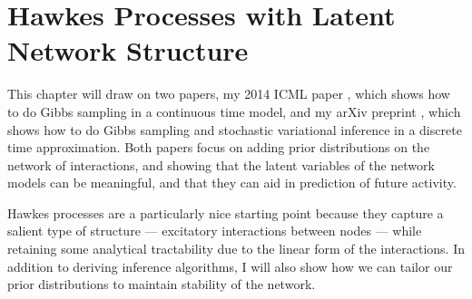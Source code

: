 
\chapter{Hawkes Processes with Latent Network Structure}

This chapter will draw on two papers, my 2014 ICML paper \cite{linderman2014discovering}, 
which shows how to do Gibbs sampling in a continuous time model,
and my arXiv preprint \cite{linderman2015scalable}, which shows 
how to do Gibbs sampling and stochastic variational inference in 
a discrete time approximation.  Both papers focus on
adding prior distributions on the network of interactions, and 
showing that the latent variables of the network models can be 
meaningful, and that they can aid in prediction of future 
activity. 

Hawkes processes are a particularly nice starting point 
because they capture a salient type of structure --- excitatory 
interactions between nodes --- while retaining some 
analytical tractability due to the linear form of the 
interactions. In addition to deriving inference algorithms, I 
will also show how we can tailor our prior distributions to 
maintain stability of the network. 

